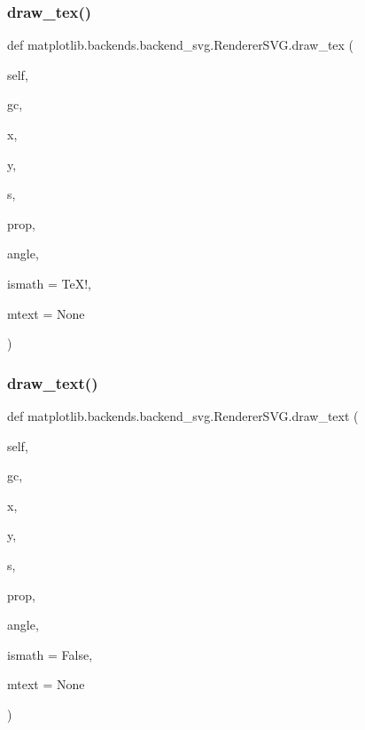 \subsubsection{\texorpdfstring{draw\+\_\+tex()}{draw\_tex()}}
{\footnotesize\ttfamily def matplotlib.\+backends.\+backend\+\_\+svg.\+Renderer\+S\+V\+G.\+draw\+\_\+tex (\begin{DoxyParamCaption}\item[{}]{self,  }\item[{}]{gc,  }\item[{}]{x,  }\item[{}]{y,  }\item[{}]{s,  }\item[{}]{prop,  }\item[{}]{angle,  }\item[{}]{ismath = {\ttfamily \textquotesingle{}TeX!\textquotesingle{}},  }\item[{}]{mtext = {\ttfamily None} }\end{DoxyParamCaption})}

\mbox{\label{classmatplotlib_1_1backends_1_1backend__svg_1_1RendererSVG_aebd281731dc19a7dc30f96345303c28b}} 
\subsubsection{\texorpdfstring{draw\+\_\+text()}{draw\_text()}}
{\footnotesize\ttfamily def matplotlib.\+backends.\+backend\+\_\+svg.\+Renderer\+S\+V\+G.\+draw\+\_\+text (\begin{DoxyParamCaption}\item[{}]{self,  }\item[{}]{gc,  }\item[{}]{x,  }\item[{}]{y,  }\item[{}]{s,  }\item[{}]{prop,  }\item[{}]{angle,  }\item[{}]{ismath = {\ttfamily False},  }\item[{}]{mtext = {\ttfamily None} }\end{DoxyParamCaption})}

